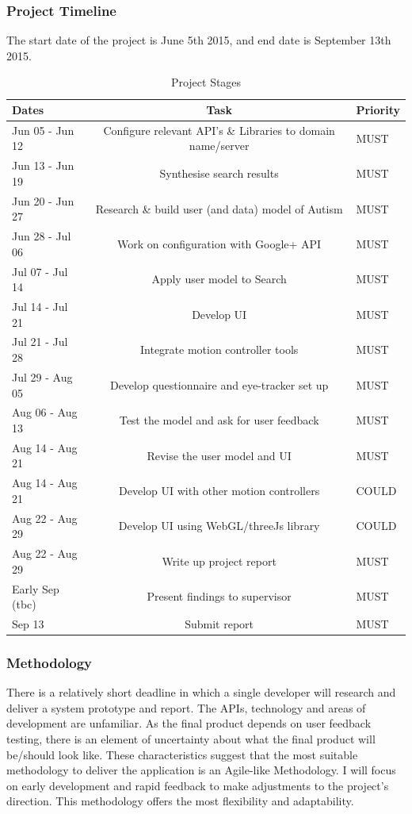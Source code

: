 \documentclass[a4paper, 10pt]{article}
\begin{document}
\subsubsection{Project Timeline}
The start date of the project is June 5th 2015, and end date is September 13th 2015. 
\begin{table}[h]
\caption{Project Stages} 
\centering
\begin{tabular}{ L |c| L}
\hline\hline 
Dates & Task & Priority\\ [0.5ex]
\hline 
Jun 05 - Jun 12 & Configure relevant API's \& Libraries to domain name/server & MUST\\
\hline 
Jun 13 - Jun 19 & Synthesise search results & MUST\\
\hline 
Jun 20 - Jun 27 & Research \& build user (and data) model of Autism & MUST\\
\hline 
Jun 28 - Jul 06 & Work on configuration with Google+ API & MUST\\
\hline 
Jul 07 - Jul 14 & Apply user model to Search& MUST\\ 
\hline 
Jul 14 - Jul 21 & Develop UI & MUST\\
\hline 
Jul 21 - Jul 28 & Integrate motion controller tools& MUST\\
\hline 
Jul 29 - Aug 05 & Develop questionnaire and eye-tracker set up & MUST\\ 
\hline 
Aug 06 - Aug 13 & Test the model and ask for user feedback & MUST\\
\hline 
Aug 14 - Aug 21 & Revise the user model and UI & MUST\\
\hline 
Aug 14 - Aug 21 & Develop UI with other motion controllers & COULD\\
\hline 
Aug 22 - Aug 29 & Develop UI using WebGL/threeJs library & COULD\\
\hline 
Aug 22 - Aug 29 & Write up project report & MUST\\ 
\hline 
Early Sep (tbc) & Present findings to supervisor & MUST\\
\hline 
Sep 13 & Submit report & MUST\\[0.5ex]
\hline
\end{tabular}
\label{stages} 
\end{table}

\subsubsection{Methodology}
There is a relatively short deadline in which a single developer will research and deliver a system prototype and report. The APIs, technology and areas of development are unfamiliar. As the final product depends on user feedback testing, there is an element of uncertainty about what the final product will be/should look like. These characteristics suggest that the most suitable methodology to deliver the application is an Agile-like Methodology. I will focus on early development and rapid feedback to make adjustments to the project's direction. This methodology offers the most flexibility and adaptability.
\end{document}
